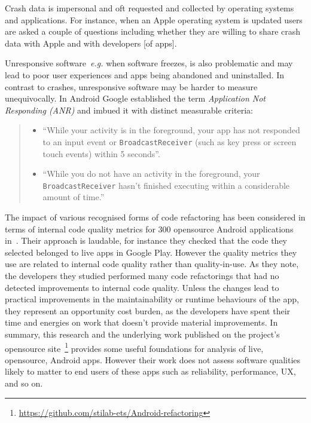 
Crash data is impersonal and oft requested and collected by operating systems and applications. For instance, when an Apple operating system is updated users are asked a couple of questions including whether they are willing to share crash data with Apple and with developers [of apps].

Unresponsive software~\emph{e.g.} when software freezes, is also problematic and may lead to poor user experiences and apps being abandoned and uninstalled. In contrast to crashes, unresponsive software may be harder to measure unequivocally. In Android Google established the term \emph{Application Not Responding (ANR)} and imbued it with distinct measurable criteria: 




\begin{quote}
\begin{itemize}
    \item ``While your activity is in the foreground, your app has not responded to an input event or \texttt{BroadcastReceiver} (such as key press or screen touch events) within 5 seconds''.
    \item ``While you do not have an activity in the foreground, your \texttt{BroadcastReceiver} hasn't finished executing within a considerable amount of time.''
\end{itemize}    
\end{quote}%



The impact of various recognised forms of code refactoring has been considered in terms of internal code quality metrics for 300 opensource Android applications in~. Their approach is laudable, for instance they checked that the code they selected belonged to live apps in Google Play. However the quality metrics they use are related to internal code quality rather than quality-in-use. As they note, the developers they studied performed many code refactorings that had no detected improvements to internal code quality. Unless the changes lead to practical improvements in the maintainability or runtime behaviours of the app, they represent an opportunity cost burden, as the developers have spent their time and energies on work that doesn't provide material improvements. In summary, this research and the underlying work published on the project's opensource site~\footnote{\url{https://github.com/stilab-ets/Android-refactoring}} provides some useful foundations for analysis of live, opensource, Android apps. However their work does not assess software qualities likely to matter to end users of these apps such as reliability, performance, UX, and so on.


